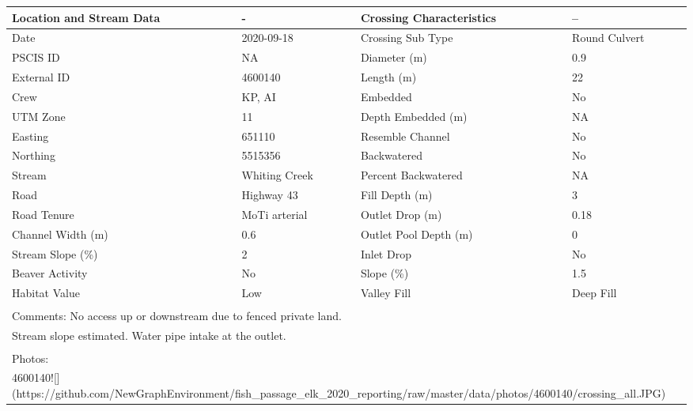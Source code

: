 \documentclass[
]{book}
\begin{document}
\begin{tabular}{l|l|l|l}
\hline
Location and Stream Data & - & Crossing Characteristics & --\\
\hline
Date & 2020-09-18 & Crossing Sub Type & Round Culvert\\
\hline
PSCIS ID & NA & Diameter (m) & 0.9\\
\hline
External ID & 4600140 & Length (m) & 22\\
\hline
Crew & KP, AI & Embedded & No\\
\hline
UTM Zone & 11 & Depth Embedded (m) & NA\\
\hline
Easting & 651110 & Resemble Channel & No\\
\hline
Northing & 5515356 & Backwatered & No\\
\hline
Stream & Whiting Creek & Percent Backwatered & NA\\
\hline
Road & Highway 43 & Fill Depth (m) & 3\\
\hline
Road Tenure & MoTi arterial & Outlet Drop (m) & 0.18\\
\hline
Channel Width (m) & 0.6 & Outlet Pool Depth (m) & 0\\
\hline
Stream Slope (\%) & 2 & Inlet Drop & No\\
\hline
Beaver Activity & No & Slope (\%) & 1.5\\
\hline
Habitat Value & Low & Valley Fill & Deep Fill\\
\hline
\multicolumn{4}{l}{\textsuperscript{} Comments: No access up or downstream due to fenced private land.}\\
\multicolumn{4}{l}{Stream slope estimated. Water pipe intake at the outlet.}\\
\multicolumn{4}{l}{\textsuperscript{} Photos:}\\
\multicolumn{4}{l}{4600140![](https://github.com/NewGraphEnvironment/fish\_passage\_elk\_2020\_reporting/raw/master/data/photos/4600140/crossing\_all.JPG)}\\
\end{tabular}
\end{document}
